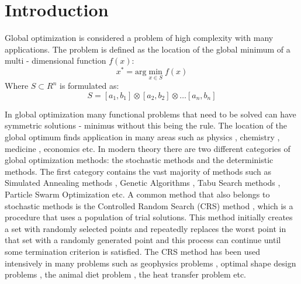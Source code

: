 \documentclass[symmetry,article,submit,moreauthors,pdftex]{mdpi}
\begin{document}
\section{Introduction }

Global optimization\cite{GO1} is considered a problem of high complexity
with many applications. The problem is defined as the location of
the global minimum of a multi - dimensional function $f(x)$:
\begin{equation}
x^{*}=\mbox{arg}\min_{x\in S}f(x)\label{eq:eq1}
\end{equation}
Where $S\subset R^{n}$ is formulated as: 
\begin{equation}
S=\left[a_{1},b_{1}\right]\otimes\left[a_{2},b_{2}\right]\otimes\ldots\left[a_{n},b_{n}\right]\label{eq:eq2}
\end{equation}

In global optimization many functional problems that need to be solved can have symmetric solutions - minimus without this being the rule. The location of the global optimum finds application in many  areas such as physics
\cite{physics1,physics2}, chemistry \cite{chemistry1,chemistry2},
medicine \cite{med1,med2}, economics\cite{econ1} etc. In modern
theory there are two different categories of global optimization methods:
the stochastic methods and the deterministic methods.  The first category
contains the vast majority of methods such as Simulated Annealing
methods \cite{simann_major,simann1,simann2}, Genetic Algorithms \cite{ga1,ga2,ga3},
Tabu Search methods \cite{tabu1}, Particle Swarm Optimization \cite{pso_major,pso1,pso2}
etc. A common method that also belongs to stochastic methods is the
Controlled Random Search (CRS) method \cite{crs1}, which is a procedure that uses a population of trial solutions. This method initially creates a set with randomly
selected points and repeatedly replaces the worst point in that set
with a randomly generated point and this process can continue until some termination criterion is satisfied. The CRS method has been used intensively
in many problems such as geophysics problems \cite{crs_geophysics,crs_geophysics2},
optimal shape design problems \cite{crs_optimalshape1}, the animal
diet problem \cite{crs_animaldiet1}, the heat transfer problem \cite{crs_heat1}
etc. 
\end{document}
